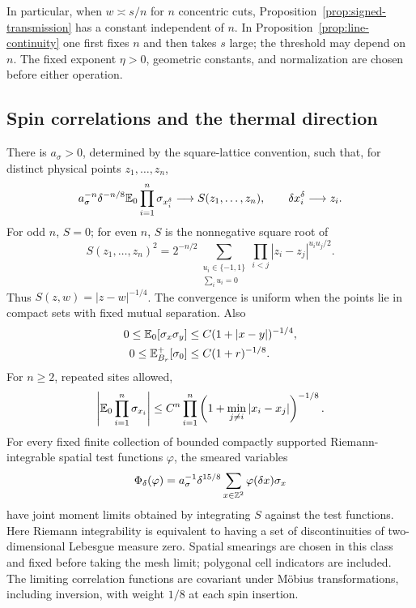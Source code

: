 In particular, when \(w\asymp s/n\) for \(n\) concentric cuts,
Proposition~\ref{prop:signed-transmission} has a constant independent
of \(n\). In Proposition~\ref{prop:line-continuity} one first fixes
\(n\) and then takes \(s\) large; the threshold may depend on
\(n\). The fixed exponent \(\eta>0\), geometric constants, and
normalization are chosen before either operation.

\subsection{Spin correlations and the thermal direction}

\begin{proposition}
\label{prop:pure-spin}
There is \(a_\sigma>0\), determined by the square-lattice convention,
such that, for distinct physical points \(z_1,\ldots,z_n\),
\[
 a_\sigma^{-n}\delta^{-n/8}
 \mathbb E_0\prod_{i=1}^n\sigma_{x_i^\delta}
 \longrightarrow S(z_1,\ldots,z_n),
 \qquad \delta x_i^\delta\longrightarrow z_i.
\]
For odd \(n\), \(S=0\); for even \(n\), \(S\) is the nonnegative
square root of
\begin{equation}
 S(z_1,\ldots,z_n)^2
 =2^{-n/2}\!\sum_{\substack{u_i\in\{-1,1\}\\\sum_i u_i=0}}
       \prod_{i<j}|z_i-z_j|^{u_iu_j/2}.
 \label{eq:pure-spin-formula}
\end{equation}
Thus \(S(z,w)=|z-w|^{-1/4}\). The convergence is uniform when the
points lie in compact sets with fixed mutual separation. Also
\begin{align}
 0\le\mathbb E_0[\sigma_x\sigma_y]&\le C(1+|x-y|)^{-1/4},
 \label{eq:pure-two-point}\\
 0\le\mathbb E^+_{B_r}[\sigma_0]&\le C(1+r)^{-1/8}.
 \label{eq:pure-plus-one-point}
\end{align}
For \(n\ge2\), repeated sites allowed,
\begin{equation}
 \left|\mathbb E_0\prod_{i=1}^n\sigma_{x_i}\right|
 \le C^n\prod_{i=1}^n
 \left(1+\min_{j\ne i}|x_i-x_j|\right)^{-1/8}.
 \label{eq:pure-multipoint-bound}
\end{equation}
For every fixed finite collection of bounded compactly supported
Riemann-integrable spatial test functions \(\varphi\), the smeared
variables
\[
 \Phi_\delta(\varphi)
 =a_\sigma^{-1}\delta^{15/8}
                  \sum_{x\in\mathbb Z^2}\varphi(\delta x)\sigma_x
\]
have joint moment limits obtained by integrating \(S\) against the
test functions. Here Riemann integrability is equivalent to having a
set of discontinuities of two-dimensional Lebesgue measure zero.
Spatial smearings are chosen in this class and fixed before taking
the mesh limit; polygonal cell indicators are included.
The limiting correlation functions are covariant under
M\"obius transformations, including inversion, with weight \(1/8\)
at each spin insertion.
\end{proposition}

